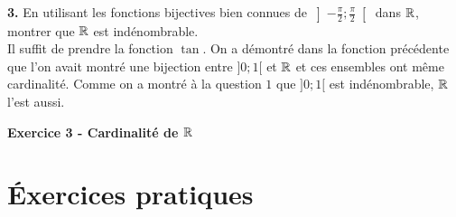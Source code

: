     \hspace*{-1.5em}\textbf{3.} En utilisant les fonctions bijectives bien connues de \(\left]-\frac{\pi}{2};\frac{\pi}{2}\right[\) dans \(\mathbb{R}\), montrer que \(\mathbb{R}\) est indénombrable.\\
    \noindent\makebox[\linewidth]{\rule{\linewidth}{0.4pt}}
    Il suffit de prendre la fonction \(\tan\). On a démontré dans la fonction précédente que l'on avait montré une bijection entre \(]0;1[\) et \(\mathbb{R}\) et ces ensembles ont même cardinalité. Comme on a montré à la question \(1\) que \(]0;1[\) est indénombrable, \(\mathbb{R}\) l'est aussi.

    \hspace*{-2.65cm}\textbf{Exercice 3 - Cardinalité de \(\mathbb{R}\)}\\
    
    
    \section{\'Exercices pratiques}\label{sec:etudes_cas}